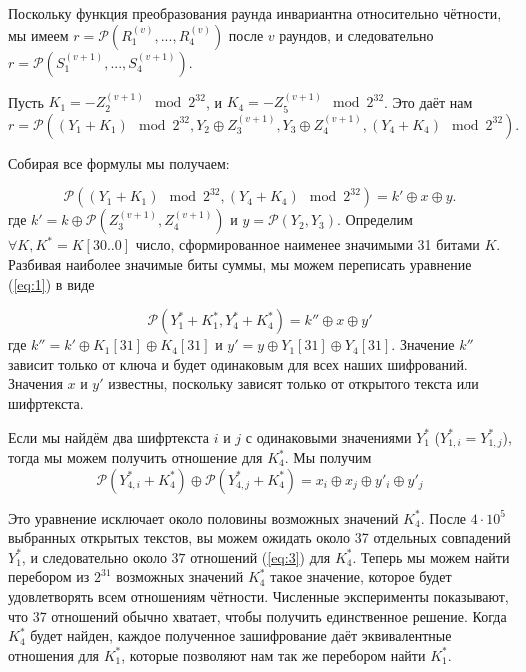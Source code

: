 \documentclass[12pt, a4paper]{article}
\begin{document}
Поскольку функция преобразования раунда инвариантна относительно чётности, мы имеем $r = \mathcal{P}(R_1^{(v)}, ..., R_4^{(v)})$ после $v$ раундов, и следовательно $r = \mathcal{P}(S_1^{(v+1)}, ..., S_4^{(v+1)})$.

Пусть $K_1 = -Z_2^{(v+1)} \mod 2^{32}$, и $K_4 = -Z_5^{(v+1)} \mod 2^{32}$. Это даёт нам
\begin{equation*}
    r = \mathcal{P}\left( \left( Y_1 + K_1 \right) \mod 2^{32}, Y_2 \oplus Z_3^{(v+1)}, Y_3 \oplus Z_4^{(v+1)}, \left( Y_4 + K_4 \right) \mod 2^{32} \right).
\end{equation*}

Собирая все формулы мы получаем:

\begin{equation} \label{eq:1}
    \mathcal{P}\left( \left( Y_1 + K_1 \right) \mod 2^{32}, \left( Y_4 + K_4 \right) \mod 2^{32} \right) = k' \oplus x \oplus y.
\end{equation}
где $k' = k \oplus \mathcal{P}\left( Z_3^{(v+1)}, Z_4^{(v+1)} \right)$ и $y = \mathcal{P}\left( Y_2, Y_3 \right)$. Определим $\forall K, K^* = K[30..0]$ число, сформированное наименее значимыми 31 битами $K$. Разбивая наиболее значимые биты суммы, мы можем переписать уравнение (\ref{eq:1}) в виде

\begin{equation}\label{eq:2}
\mathcal{P} \left( Y^*_1 + K^*_1, Y^*_4 + K^*_4 \right) = k'' \oplus x \oplus y'
\end{equation}
где $k'' = k' \oplus K_1[31] \oplus K_4[31]$ и $y' = y \oplus Y_1[31] \oplus Y_4[31]$. Значение $k''$ зависит только от ключа и будет одинаковым для всех наших шифрований. Значения $x$ и $y'$ известны, поскольку зависят только от открытого текста или шифртекста.

Если мы найдём два шифртекста $i$ и $j$ с одинаковыми значениями $Y^*_1$ ($Y^*_{1,i} = Y^*_{1,j}$), тогда мы можем получить отношение для $K^*_4$. Мы получим
\begin{equation}\label{eq:3}
\mathcal{P}\left( Y^*_{4,i} + K^*_4 \right) \oplus \mathcal{P} \left( Y^*_{4,j} + K^*_4 \right) = x_i \oplus x_j \oplus y'_i \oplus y'_j
\end{equation}

Это уравнение исключает около половины возможных значений $K^*_4$. После $4 \cdot 10^5$ выбранных открытых текстов, вы можем ожидать около 37 отдельных совпадений $Y^*_1$, и следовательно около $37$ отношений (\ref{eq:3}) для $K^*_4$. Теперь мы можем найти перебором из $2^{31}$ возможных значений $K^*_4$ такое значение, которое будет удовлетворять всем отношениям чётности. Численные эксперименты показывают, что 37 отношений обычно хватает, чтобы получить единственное решение. Когда $K^*_4$ будет найден, каждое полученное зашифрование даёт эквивалентные отношения для $K^*_1$, которые позволяют нам так же перебором найти $K^*_1$.
\end{document}
